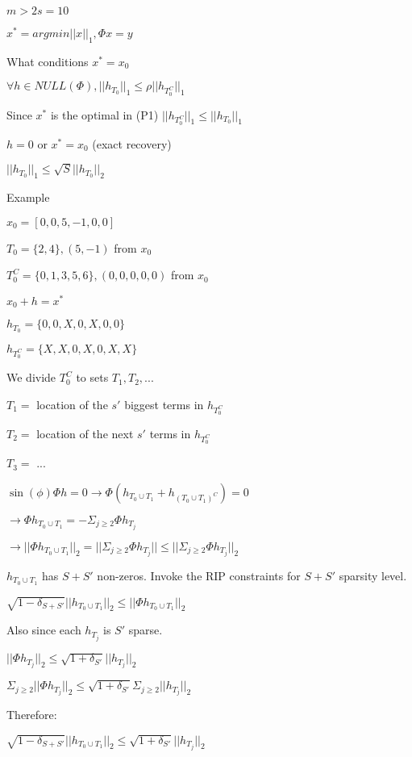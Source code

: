 \documentclass[12pt,letterpaper]{report}
\begin{document}
$m > 2s = 10$

$x^* = argmin||x||_1, \Phi x = y$

What conditions $x^* = x_0$

$\forall h \in NULL(\Phi), ||h_{T_0}||_1 \leq \rho ||h_{T_0^C}||_1$

Since $x^*$ is the optimal in (P1) $||h_{T_0^C}||_1 \leq ||h_{T_0}||_1$

$h = 0$ or $x^* = x_0$ (exact recovery)

$||h_{T_0}||_1 \leq \sqrt{S} ||h_{T_0}||_2$

\vspace{1cm}
Example

$x_0 = [0, 0, 5, -1, 0, 0]$

$T_0 = \{2, 4\}, (5,-1)$ from $x_0$

$T_0^C = \{0, 1, 3, 5, 6 \}, (0,0,0,0,0)$ from $x_0$

$x_0 + h = x^*$

$h_{T_0} =   \{0, 0, X, 0, X, 0, 0\}$

$h_{T_0^C} = \{X, X, 0, X, 0, X, X\}$

We divide $T_0^C$ to sets $T_1, T_2, ...$

$T_1 = $ location of the $s'$ biggest terms in $h_{T_0^C}$

$T_2 = $ location of the next $s'$ terms in $h_{T_0^C}$

$T_3 = $ ...

$\sin(\phi) \Phi h = 0 \rightarrow \Phi (h_{T_0 \cup T_1} + h_{(T_0 \cup T_1)^C}) = 0$

$\rightarrow \Phi h_{T_0 \cup T_1} = - \Sigma_{j \geq 2} \Phi h_{T_j}$

$\rightarrow ||\Phi h_{T_0 \cup T_1}||_2 = ||\Sigma_{j \geq 2} \Phi h_{T_j}|| \leq ||\Sigma_{j \geq 2} \Phi h_{T_j}||_2$

$h_{T_0 \cup T_1}$ has $S + S'$ non-zeros.  Invoke the RIP constraints for $S + S'$ sparsity level.

$\sqrt{1 - \delta_{S+ S'}} ||h_{T_0 \cup T_1}||_2 \leq ||\Phi h_{T_0 \cup T_1}||_2$

Also since each $h_{T_j}$ is $S'$ sparse.

$||\Phi h_{T_j}||_2 \leq \sqrt{1 + \delta_{S'}} ||h_{T_j}||_2$

$\Sigma_{j \geq 2} ||\Phi h_{T_j}||_2 \leq \sqrt{1 + \delta_{S'}} \Sigma_{j \geq 2}  ||h_{T_j}||_2$

Therefore:

$\sqrt{1 - \delta_{S+S'}}  ||h_{T_0 \cup T_1}||_2 \leq
 \sqrt{1 + \delta_{S'}}  ||h_{T_j}||_2$
\end{document}
